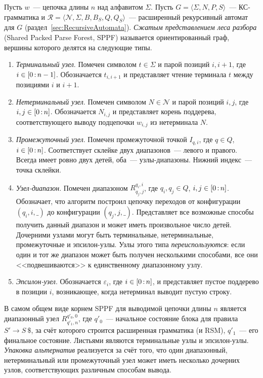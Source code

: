 \begin{definition}
	\label{def:SPPF}
	Пусть $w$~--- цепочка длины $n$ над алфавитом $\Sigma$.
    Пусть $G = \langle \Sigma, N, P, S \rangle$~--- КС-грамматика и $\mathcal{R} = \langle \mathcal{N},\Sigma,B,B_S,Q,Q_S \rangle$~--- расширенный рекурсивный автомат для $G$ (раздел~\ref{sec:RecursiveAutomata}).
    \emph{Сжатым представлением леса разбора} (Shared Packed Parse Forest, SPPF) называется ориентированный граф, вершины которого делятся на следующие типы.
	\begin{enumerate}
		\item \emph{Терминальный узел}. Помечен символом $t \in \Sigma$ и парой позиций $i, i+1$, где $i \in [0 \rng n-1]$.
		Обозначается $t_{i,i+1}$ и представляет чтение терминала $t$ между позициями $i$ и $i+1$.
		\item \emph{Нетерминальный узел}. Помечен символом $N \in \mathcal{N}$ и парой позиций $i, j$, где $i, j \in [0 \rng n]$.
		Обозначается $N_{i,j}$ и представляет корень поддерева, соответствующего выводу подцепочки $w_{i,j}$ из нетерминала $N$.
		\item \emph{Промежуточный узел}. Помечен промежуточной точкой $I_{q,i}$, где $q \in Q$, $i \in [0 \rng n]$. Соответствует склейке двух диапазонов~--- левого и правого. Всегда имеет ровно двух детей, оба~--- узлы-диапазоны. Нижний индекс~--- точка склейки.
		\item \emph{Узел-диапазон}. Помечен диапазоном $R^{q_i,i}_{q_j,j}$, где $q_i,q_j \in Q$, $i,j \in [0 \rng n]$. Обозначает, что алгоритм построил цепочку переходов от конфигурации $(q_i,i,\_)$ до конфигурации $(q_j,j,\_)$. Представляет все возможные способы получить данный диапазон и может иметь произвольное число детей. Дочерними узлами могут быть терминальные, нетерминальные, промежуточные и эпсилон-узлы. Узлы этого типа \emph{переиспользуются}: если один и тот же диапазон может быть получен несколькими способами, все они <<подвешиваются>> к единственному диапазонному узлу.
		\item \emph{Эпсилон-узел}. Обозначается $\varepsilon_i$, где $i \in [0 \rng n]$, и представляет пустое поддерево в позиции $i$, возникающее, когда нетерминал выводит пустую строку.
	\end{enumerate}
\end{definition}

В самом общем виде корнем SPPF для выводимой цепочки длины $n$ является диапазонный узел $R^{q'_0,0}_{q'_1,n}$, где $q'_0$~--- начальное состояние блока для правила $S' \to S \ \$ $, за счёт которого строится расширенная грамматика (и RSM), $q'_1$~--- его финальное состояние.
Листьями являются терминальные узлы и эпсилон-узлы.
\emph{Упаковка альтернатив} реализуется за счёт того, что один диапазонный, нетерминальный или промежуточный узел может иметь несколько дочерних узлов, соответствующих различным способам вывода.

